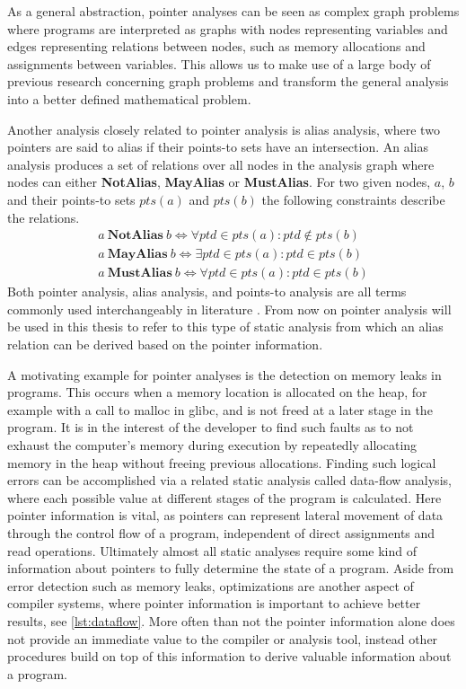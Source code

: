 As a general abstraction, pointer analyses can be seen as complex graph problems where programs are interpreted as graphs with nodes representing variables and edges representing relations between nodes, such as memory allocations and assignments between variables.
This allows us to make use of a large body of previous research concerning graph problems and transform the general analysis into a better defined mathematical problem.

Another analysis closely related to pointer analysis is alias analysis, where two pointers are said to alias if their points-to sets have an intersection. An alias analysis produces a set of relations over all nodes in the analysis graph where nodes can either \textbf{NotAlias}, \textbf{MayAlias} or \textbf{MustAlias}.
For two given nodes, $a$, $b$ and their points-to sets $pts(a)$ and $pts(b)$ the following constraints describe the relations.
\begin{align}
    a\ \textbf{NotAlias}\ b \iff \forall ptd \in pts(a) \colon ptd \notin pts(b)\label{eq:alias1}\\
    a\ \textbf{MayAlias}\ b \iff \exists ptd \in pts(a) \colon ptd \in pts(b)\label{eq:alias2}\\
    a\ \textbf{MustAlias}\ b \iff \forall ptd \in pts(a) \colon ptd \in pts(b)
\end{align}
Both pointer analysis, alias analysis, and points-to analysis are all terms commonly used interchangeably in literature \cite{hind2001pointer}. From now on pointer analysis will be used in this thesis to refer to this type of static analysis from which an alias relation can be derived based on the pointer information.

A motivating example for pointer analyses is the detection on memory leaks in programs.
This occurs when a memory location is allocated on the heap, for example with a call to malloc in glibc, and is not freed at a later stage in the program.
It is in the interest of the developer to find such faults as to not exhaust the computer's memory during execution by repeatedly allocating memory in the heap without freeing previous allocations.
Finding such logical errors can be accomplished via a related static analysis called data-flow analysis, where each possible value at different stages of the program is calculated. Here pointer information is vital, as pointers can represent lateral movement of data through the control flow of a program, independent of direct assignments and read operations. Ultimately almost all static analyses require some kind of information about pointers to fully determine the state of a program.
Aside from error detection such as memory leaks, optimizations are another aspect of compiler systems, where pointer information is important to achieve better results, see \autoref{lst:dataflow}.
More often than not the pointer information alone does not provide an immediate value to the compiler or analysis tool, instead other procedures build on top of this information to derive valuable information about a program.

